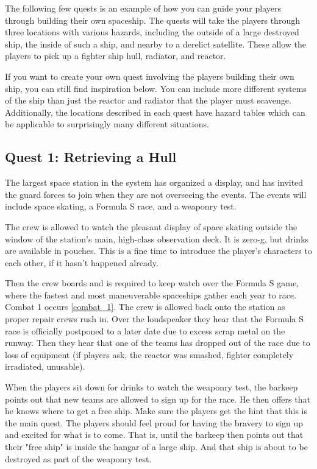 \documentclass[a4paper]{article}
\begin{document}
The following few quests is an example of how you can guide your players through building their own spaceship. The quests will take the players through three locations with various hazards, including the outside of a large destroyed ship, the inside of such a ship, and nearby to a derelict satellite. These allow the players to pick up a fighter ship hull, radiator, and reactor. 

If you want to create your own quest involving the players building their own ship, you can still find inspiration below. You can include more different systems of the ship than just the reactor and radiator that the player must scavenge. Additionally, the locations described in each quest have hazard tables which can be applicable to surprisingly many different situations. 

\subsection{Quest 1: Retrieving a Hull} \label{quest_1}

The largest space station in the system has organized a display, and has invited the guard forces to join when they are not overseeing the events. The events will include space skating, a Formula S race, and a weaponry test.

The crew is allowed to watch the pleasant display of space skating outside the window of the station's main, high-class observation deck. It is zero-g, but drinks are available in pouches. This is a fine time to introduce the player's characters to each other, if it hasn't happened already.

Then the crew boards and is required to keep watch over the Formula S game, where the fastest and most maneuverable spaceships gather each year to race. Combat 1 occurs \ref{combat_1}. The crew is allowed back onto the station as proper repair crews rush in. Over the loudspeaker they hear that the Formula S race is officially postponed to a later date due to excess scrap metal on the runway.  Then they hear that one of the teams has dropped out of the race due to loss of equipment (if players ask, the reactor was smashed, fighter completely irradiated, unusable). 

When the players sit down for drinks to watch the weaponry test, the barkeep points out that new teams are allowed to sign up for the race. He then offers that he knows where to get a free ship. Make sure the players get the hint that this is the main quest. The players should feel proud for having the bravery to sign up and excited for what is to come. That is, until the barkeep then points out that their "free ship" is inside the hangar of a large ship. And that ship is about to be destroyed as part of the weaponry test.
\end{document}
